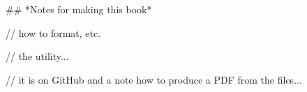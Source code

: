 ## *Notes for making this book*

// how to format, etc.

// the utility...

// it is on GitHub and a note how to produce a PDF from the files...


